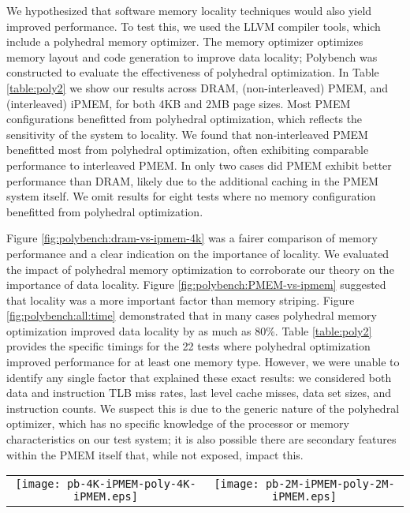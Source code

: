 We hypothesized that software memory locality techniques would also yield improved performance.  To test this, we used the LLVM compiler tools, which include a polyhedral memory optimizer. The memory optimizer optimizes memory layout and code generation to improve data locality; Polybench was constructed to evaluate the effectiveness of polyhedral optimization.  In Table \ref{table:poly2} we show our results across DRAM, (non-interleaved) PMEM, and (interleaved) iPMEM, for both 4KB and 2MB page sizes.  Most PMEM configurations benefitted from polyhedral optimization, which reflects the sensitivity of the system to locality. We found that non-interleaved PMEM benefitted most from polyhedral optimization, often exhibiting comparable performance to interleaved PMEM.  In only two cases did PMEM exhibit better performance than DRAM, likely due to the additional caching in the PMEM system itself. We omit results for eight tests where no memory configuration benefitted from polyhedral optimization.

Figure \ref{fig:polybench:dram-vs-ipmem-4k} was a fairer comparison of memory performance and a clear indication on the importance of locality.  We evaluated the impact of polyhedral memory optimization to corroborate our theory on the importance of data locality.  Figure \ref{fig:polybench:PMEM-vs-ipmem} suggested that locality was a more important factor than memory striping. Figure \ref{fig:polybench:all:time} demonstrated that in many cases polyhedral memory optimization improved data locality by as much as 80\%.  Table \ref{table:poly2} provides the specific timings for the 22 tests where polyhedral optimization improved performance for at least one memory type.  However, we were unable to identify any single factor that explained these exact results: we considered both data and instruction TLB miss rates, last level cache misses, data set sizes, and instruction counts. We suspect this is due to the generic nature of the polyhedral optimizer, which has no specific knowledge of the processor or memory characteristics on our test system; it is also possible there are secondary features within the PMEM itself that, while not exposed, impact this. 

\begin{figure*}[!th]
  \captionsetup{justification=centering}
  \centering
  \caption{Polyhedral Memory optimizations for interleaved PMEM (iPMEM), 4K and 2M pages.  Varying cache layers impact performance differently. Results sorted by execution time without polyhedral optimization. Boldface indicates improvement with poly optimization.}
  \vspace{0.1cm}
  \label{fig:polybench:all:time}
  \begin{tabular}{cc}
    \texttt{[image: pb-4K-iPMEM-poly-4K-iPMEM.eps]} &
    \texttt{[image: pb-2M-iPMEM-poly-2M-iPMEM.eps]} 
  \end{tabular}
\end{figure*}

